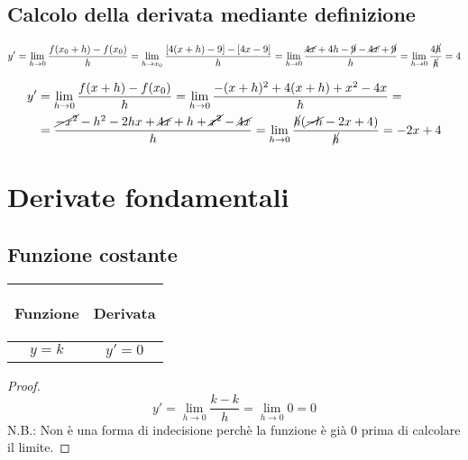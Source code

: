 \subsection{Calcolo della derivata mediante definizione}
\begin{ex}[Calcolare la derivata di $y=4x-9$ mediante definizione.]
    \[\begin{aligned}y'=\lim_{h\to 0}\frac{f(x_0+h)-f(x_0)}{h}= \lim_{h\to x_0} \frac{\left[ 4(x+h)-9 \right]-\left[ 4x-9 \right]}{h}=\lim_{h\to 0}\frac{\cancel{4x}+4h-\cancel{9}-\cancel{4x}+\cancel{9}}{h}=\lim_{h\to0}\frac{4\cancel{h}}{\cancel{h}}=4\end{aligned}\]
\end{ex}
\begin{ex}[Calcolare la derivata di $y=-x^2+4x$ mediante definizione]
    \[\begin{aligned}
        y'&= \lim_{h\to 0} \frac{f(x+h)-f(x_0)}{h}= \lim_{h\to 0}\frac{-(x+h)^2+4(x+h)+x^2-4x}{h}=\\&=\frac{\cancel{-x^2}-h^2-2hx+\cancel{4x}+h+\cancel{x^2}-\cancel{4x}}{h}= \lim_{h\to 0}\frac{\cancel{h}(\cancel{-h}-2x+4)}{\cancel{h}}=-2x+4
    \end{aligned}\]
\end{ex}
\section{Derivate fondamentali}
\subsection{Funzione costante}
\begin{center}
    \begin{tabular}{m{}|m{}}
        \begin{center}
            \textbf{Funzione}
        \end{center}
        & 
        \begin{center}
            \textbf{Derivata}
        \end{center}\\
        \hline
            \[y=k\]&
            \[y'=0\]
    \end{tabular}
\end{center}
\begin{proof}
    \[y'=\lim_{h\to 0}\frac{k-k}{h}=\lim_{h\to 0}0=0\]
    N.B.: Non è una forma di indecisione perchè la funzione è già 0 prima di calcolare il limite.
\end{proof}

